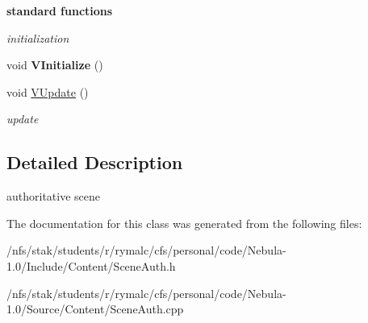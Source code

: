 \begin{Indent}{\bf standard functions}\par
{\em \label{_amgrp57f1c50bd31a278c7d9f58b3e669c84c}
 initialization }\begin{DoxyCompactItemize}
\item 
\hypertarget{classContent_1_1SceneAuth_af7b07d1ddfb90416589ff5b60be6854c}{
void {\bfseries VInitialize} ()}
\label{classContent_1_1SceneAuth_af7b07d1ddfb90416589ff5b60be6854c}

\item 
\hypertarget{classContent_1_1SceneAuth_a8865ea2d70b0401bb9ddaa77d1740090}{
void \hyperlink{classContent_1_1SceneAuth_a8865ea2d70b0401bb9ddaa77d1740090}{VUpdate} ()}
\label{classContent_1_1SceneAuth_a8865ea2d70b0401bb9ddaa77d1740090}

\begin{DoxyCompactList}\small\item\em update \item\end{DoxyCompactList}\end{DoxyCompactItemize}
\end{Indent}


\subsection{Detailed Description}
authoritative scene 

The documentation for this class was generated from the following files:\begin{DoxyCompactItemize}
\item 
/nfs/stak/students/r/rymalc/cfs/personal/code/Nebula-\/1.0/Include/Content/SceneAuth.h\item 
/nfs/stak/students/r/rymalc/cfs/personal/code/Nebula-\/1.0/Source/Content/SceneAuth.cpp\end{DoxyCompactItemize}
